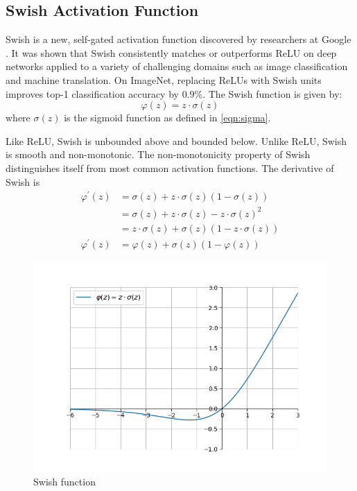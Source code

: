 \documentclass[12pt]{report}
\numberwithin{equation}{section}
\begin{document}
\subsection{Swish Activation Function}
Swish is a new, self-gated activation function discovered by researchers at Google {\cite{DBLP:journals/corr/abs-1710-05941}}. It was shown that Swish consistently matches or outperforms ReLU on deep networks applied to a variety of challenging domains such as image classification and machine translation. On ImageNet, replacing ReLUs with Swish units improves top-1 classification accuracy by $0.9\%$. The Swish function is given by:
\begin{equation}\label{eqn:swish}
\varphi(z) = z\cdot\sigma(z)
\end{equation}
where $\sigma(z)$ is the sigmoid function as defined in \eqref{eqn:sigma}.

Like ReLU, Swish is unbounded above and bounded below. Unlike ReLU, Swish is smooth and non-monotonic. The non-monotonicity property of Swish distinguishes itself from most common activation functions. The derivative of Swish is
\begin{equation}\label{eqn:swish_prime}
\begin{split}
\varphi^{\prime}(z) &=\sigma(z)+ z \cdot \sigma(z)(1-\sigma(z)) \\
	&=\sigma(z)+z \cdot \sigma(z)-z \cdot \sigma(z)^{2} \\
	&=z \cdot \sigma(z)+\sigma(z)(1-z \cdot \sigma(z)) \\
\varphi^{\prime}(z)	&=\varphi(z)+\sigma(z)(1-\varphi(z))
\end{split}
\end{equation}
\begin{figure}[htb!]
\centering 
\includegraphics[scale=0.9]{png/swish.png} 
\caption{Swish function}
\label{fig:swish}
\end{figure}
\end{document}
